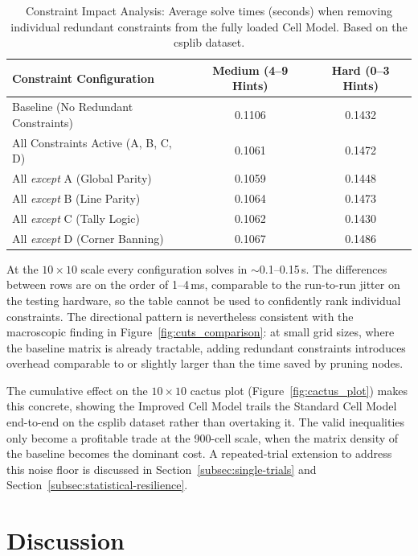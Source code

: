 \begin{table}[htbp]
  \centering
  \caption{Constraint Impact Analysis: Average solve times (seconds) when removing individual redundant constraints from the fully loaded Cell Model. Based on the \gls{csplib} dataset.}
  \label{tab:full_constraint_analysis}
  \begin{tabular}{lcc}
    \toprule
    Constraint Configuration & Medium (4--9 Hints) & Hard (0--3 Hints) \\
    \midrule
    Baseline (No Redundant Constraints)     & 0.1106 & 0.1432 \\
    All Constraints Active (A, B, C, D)     & 0.1061 & 0.1472 \\
    \midrule
    All \textit{except} A (Global Parity)   & 0.1059 & 0.1448 \\
    All \textit{except} B (Line Parity)     & 0.1064 & 0.1473 \\
    All \textit{except} C (Tally Logic)     & 0.1062 & 0.1430 \\
    All \textit{except} D (Corner Banning)  & 0.1067 & 0.1486 \\
    \bottomrule
  \end{tabular}
\end{table}

At the $10 \times 10$ scale every configuration solves in $\sim$0.1--0.15\,s. The differences between rows are on the order of 1--4\,ms, comparable to the run-to-run jitter on the testing hardware, so the table cannot be used to confidently rank individual constraints. The directional pattern is nevertheless consistent with the macroscopic finding in Figure~\ref{fig:cuts_comparison}: at small grid sizes, where the baseline matrix is already tractable, adding redundant constraints introduces overhead comparable to or slightly larger than the time saved by pruning nodes.

The cumulative effect on the $10 \times 10$ cactus plot (Figure~\ref{fig:cactus_plot}) makes this concrete, showing the Improved Cell Model trails the Standard Cell Model end-to-end on the \gls{csplib} dataset rather than overtaking it. The valid inequalities only become a profitable trade at the 900-cell scale, when the matrix density of the baseline becomes the dominant cost. A repeated-trial extension to address this noise floor is discussed in Section~\ref{subsec:single-trials} and Section~\ref{subsec:statistical-resilience}.

\section{Discussion}\label{sec:discussion}

